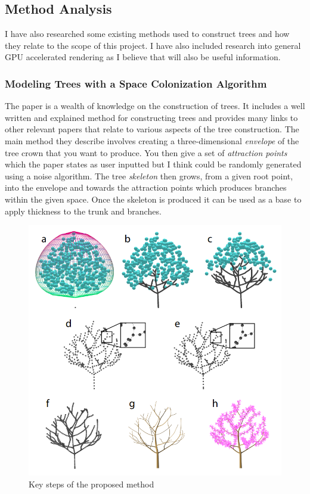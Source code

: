 \documentclass[proposal]{cmpreport}
\begin{document}
\pagebreak
\subsection{Method Analysis}
I have also researched some existing methods used to construct trees and how they 
relate to the scope of this project. I have also included research into general 
GPU accelerated rendering as I believe that will also be useful information.

\subsubsection{Modeling Trees with a Space Colonization Algorithm}
The paper \cite{colonization} is a wealth of knowledge on the construction of trees. 
It includes a well written and explained method for constructing trees and provides 
many links to other relevant papers that relate to various aspects of the tree 
construction. The main method they describe involves creating a three-dimensional 
\textit{envelope} of the tree crown that you want to produce. You then give a set of 
\textit{attraction points} which the paper states as user inputted but I think could be 
randomly generated using a noise algorithm. The tree \textit{skeleton} then grows, from a 
given root point, into the envelope and towards the attraction points which produces 
branches within the given space. Once the skeleton is produced it can be used as a 
base to apply thickness to the trunk and branches.

\begin{figure}[h]
        \caption{Key steps of the proposed method}
        \includegraphics[scale=0.47]{AttractionPoints}
        \centering
\end{figure}
\end{document}
